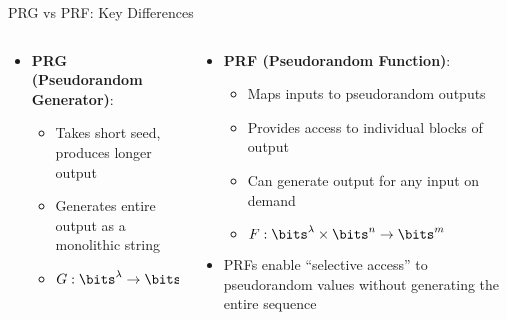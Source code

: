 \documentclass[aspectratio=169, lualatex, handout]{beamer}
\begin{document}
\begin{frame}{PRG vs PRF: Key Differences}
	\begin{columns}[t]
		\begin{column}{0.5\textwidth}
			\begin{itemize}
				\item \textbf{PRG (Pseudorandom Generator)}:
				      \begin{itemize}
					      \item Takes short seed, produces longer output
					      \item Generates entire output as a monolithic string
					      \item $G: \bits^\lambda \rightarrow \bits^{\lambda+\ell}$
				      \end{itemize}
			\end{itemize}
			\begin{center}
			\end{center}
		\end{column}
		\begin{column}{0.5\textwidth}
			\begin{itemize}
				\item \textbf{PRF (Pseudorandom Function)}:
				      \begin{itemize}
					      \item Maps inputs to pseudorandom outputs
					      \item Provides access to individual blocks of output
					      \item Can generate output for any input on demand
					      \item $F: \bits^\lambda \times \bits^n \rightarrow \bits^m$
				      \end{itemize}
				\item PRFs enable ``selective access'' to pseudorandom values without generating the entire sequence
			\end{itemize}
		\end{column}
	\end{columns}
\end{frame}
\end{document}
